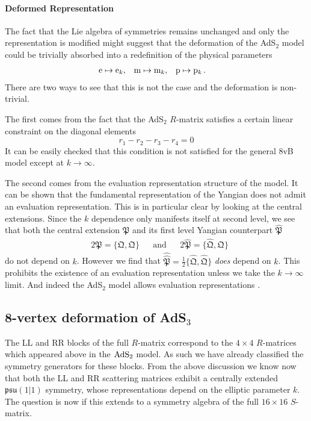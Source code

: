 \documentclass[12pt,a4paper]{article}
\numberwithin{equation}{section}
\newcommand{\kQ}{\mathfrak{Q}}
\newcommand{\kP}{\mathfrak{P}}
\begin{document}
\paragraph{Deformed Representation}

The fact that the Lie algebra of symmetries remains unchanged and only the representation is modified might suggest that the deformation of the AdS${}_{2}$ model could be trivially absorbed into a redefinition of the physical parameters 
%
\begin{align}
&{\rm e} \mapsto {\rm e}_k,&& {\rm m} \mapsto {\rm m}_k,&& {\rm p} \mapsto {\rm p}_k\,.
\end{align}
%
There are two ways to see that this is not the case and the deformation is non-trivial. 

The first comes from the fact that the AdS${}_{2}$ $ R $-matrix satisfies a certain linear constraint on the diagonal elements 
%
\begin{equation}
r_1 - r_2 - r_3 - r_4 = 0 
\end{equation} 
%
It can be easily checked that this condition is not satisfied for the general 8vB model except at $k\rightarrow \infty$. 

The second comes from the evaluation representation structure of the model. It can be shown that the fundamental representation of the Yangian does not admit an evaluation representation. This is in particular clear by looking at the central extensions. Since the $k$ dependence only manifests itself at second level, we see that both the central extension $\kP$ and its first level Yangian counterpart $\hat{\kP}$
%
\begin{align}
&2\kP = \{\kQ,\kQ\} &&\mathrm{and}
&& 2\hat{\kP} = \{\hat{\kQ},\kQ\}
\end{align}
%
do not depend on $k$. However we find that $\hat{\hat{\kP}} = \frac{1}{2} \{\hat{\kQ},\hat{\kQ}\}$ \textit{does} depend on $k$. This prohibits the existence of an evaluation representation unless we take the $k\rightarrow\infty$ limit. And indeed the AdS${}_{2}$ model allows evaluation representations \cite{Hoare:2015kla}. 

\subsection{8-vertex deformation of AdS$_3$}

The LL and RR blocks of the full $R$-matrix correspond to the $4\times 4$ $R$-matrices which appeared above in the ${\rm AdS}_2$ model. As such we have already classified the symmetry generators for these blocks. From the above discussion we know now that both the LL and RR scattering matrices exhibit a centrally extended $\mathfrak{psu}(1|1)$ symmetry, whose representations depend on the elliptic parameter $k$. The question is now if this extends to a symmetry algebra of the full $16\times 16$ $S$-matrix. 
\end{document}
